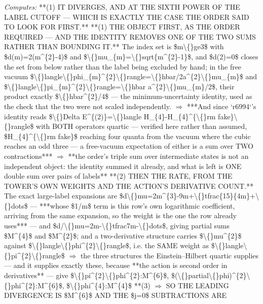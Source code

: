 \begin{description}
\emph{Computes:} **(1) IT DIVERGES, AND AT THE SIXTH POWER OF THE LABEL CUTOFF --- WHICH IS EXACTLY THE CASE THE ORDER SAID TO LOOK FOR FIRST.**  **(1)  THE OBJECT FIRST, AS THE ORDER REQUIRED --- AND THE IDENTITY REMOVES ONE OF THE TWO SUMS RATHER THAN BOUNDING IT.** The index set is \$m\textbackslash\{\}ge3\$ with \$d(m)=2(m\textasciicircum{}\{2\}-4)\$ and \$\textbackslash\{\}mu\_\{m\}=\textbackslash\{\}sqrt\{m\textasciicircum{}\{2\}-1\}\$, and \$d(2)=0\$ closes the set from below rather than the label being excluded by hand; in the free vacuum \$\textbackslash\{\}langle\textbackslash\{\}phi\_\{m\}\textasciicircum{}\{2\}\textbackslash\{\}rangle=\textbackslash\{\}hbar/2a\textasciicircum{}\{2\}\textbackslash\{\}mu\_\{m\}\$ and \$\textbackslash\{\}langle\textbackslash\{\}pi\_\{m\}\textasciicircum{}\{2\}\textbackslash\{\}rangle=\textbackslash\{\}hbar a\textasciicircum{}\{2\}\textbackslash\{\}mu\_\{m\}/2\$, their product exactly \$\textbackslash\{\}hbar\textasciicircum{}\{2\}/4\$ --- the minimum-uncertainty identity, used as the check that the two were not scaled independently. \ensuremath{\Rightarrow} ***And since `r6994`'s identity reads \$\textbackslash\{\}Delta E\textasciicircum{}\{(2)\}=\textbackslash\{\}langle H\_\{4\}-H\_\{4\}\textasciicircum{}\{\textbackslash\{\}rm fake\}\textbackslash\{\}rangle\$ with BOTH operators quartic --- verified here rather than assumed, \$H\_\{4\}\textasciicircum{}\{\textbackslash\{\}rm fake\}\$ reaching four quanta from the vacuum where the cubic reaches an odd three --- a free-vacuum expectation of either is a sum over TWO contractions*** \ensuremath{\Rightarrow} **the order's triple sum over intermediate states is not an independent object: the identity summed it already, and what is left is ONE double sum over pairs of labels**  **(2) THEN THE RATE, FROM THE TOWER'S OWN WEIGHTS AND THE ACTION'S DERIVATIVE COUNT.** The exact large-label expansions are \$d\textbackslash\{\}mu=2m\textasciicircum{}\{3\}-9m+\textbackslash\{\}tfrac\{15\}\{4m\}+\textbackslash\{\}dots\$ --- ***whose \$1/m\$ term is this row's own logarithmic coefficient, arriving from the same expansion, so the weight is the one the row already uses*** --- and \$d/\textbackslash\{\}mu=2m-\textbackslash\{\}tfrac7m-\textbackslash\{\}dots\$, giving partial sums \$M\textasciicircum{}\{4\}\$ and \$M\textasciicircum{}\{2\}\$; and a two-derivative structure carries \$\textbackslash\{\}mu\textasciicircum{}\{2\}\$ against \$\textbackslash\{\}langle\textbackslash\{\}phi\textasciicircum{}\{2\}\textbackslash\{\}rangle\$, i.e. the SAME weight as \$\textbackslash\{\}langle\textbackslash\{\}pi\textasciicircum{}\{2\}\textbackslash\{\}rangle\$ \ensuremath{\Rightarrow} the three structures the Einstein--Hilbert quartic supplies --- and it supplies exactly these, because **the action is second order in derivatives** --- give \$\textbackslash\{\}pi\textasciicircum{}\{2\}\textbackslash\{\}phi\textasciicircum{}\{2\}:M\textasciicircum{}\{6\}\$, \$(\textbackslash\{\}partial\textbackslash\{\}phi)\textasciicircum{}\{2\}\textbackslash\{\}phi\textasciicircum{}\{2\}:M\textasciicircum{}\{6\}\$, \$\textbackslash\{\}phi\textasciicircum{}\{4\}:M\textasciicircum{}\{4\}\$  **(3)  \ensuremath{\Rightarrow} SO THE LEADING DIVERGENCE IS \$M\textasciicircum{}\{6\}\$ AND THE \$j=0\$ SUBTRACTIONS ARE 
\end{description}
